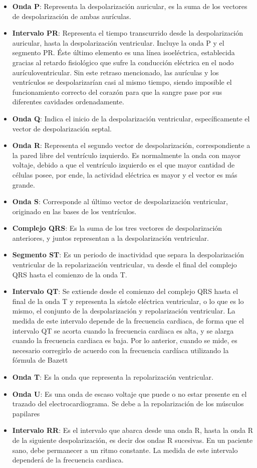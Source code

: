     \begin{itemize}
        \item \textbf{Onda P}: Representa la despolarización auricular, es la suma de los vectores de despolarización de ambas aurículas.
        \item \textbf{Intervalo PR}: Representa el tiempo transcurrido desde la despolarización auricular, hasta la despolarización ventricular. Incluye la onda P y el segmento PR. Éste último elemento es una línea isoeléctrica, establecida gracias al retardo fisiológico que sufre la conducción eléctrica en el nodo aurículoventricular. Sin este retraso mencionado, las aurículas y los ventrículos se despolarizarían casi al mismo tiempo, siendo imposible el funcionamiento correcto del corazón para que la sangre pase por sus diferentes cavidades ordenadamente.
        \item \textbf{Onda Q}: Indica el inicio de la despolarización ventricular, específicamente el vector de despolarización septal.
        \item \textbf{Onda R}: Representa el segundo vector de despolarización, correspondiente a la pared libre del ventrículo izquierdo. Es normalmente la onda con mayor voltaje, debido a que el ventrículo izquierdo es el que mayor cantidad de células posee, por ende, la actividad eléctrica es mayor y el vector es más grande.
        \item \textbf{Onda S}: Corresponde al último vector de despolarización ventricular, originado en las bases de los ventrículos.
        \item \textbf{Complejo QRS}: Es la suma de los tres vectores de despolarización anteriores, y juntos representan a la despolarización ventricular.
        \item \textbf{Segmento ST}: Es un periodo de inactividad que separa la despolarización ventricular de la repolarización ventricular, va desde el final del complejo QRS hasta el comienzo de la onda T. 
        \item \textbf{Intervalo QT}: Se extiende desde el comienzo del complejo QRS hasta el final de la onda T y representa la sístole eléctrica ventricular, o lo que es lo mismo, el conjunto de la despolarización y repolarización ventricular. La medida de este intervalo depende de la frecuencia cardiaca, de forma que el intervalo QT se acorta cuando la frecuencia cardiaca es alta, y se alarga cuando la frecuencia cardiaca es baja. Por lo anterior, cuando se mide, es necesario corregirlo de acuerdo con la frecuencia cardíaca utilizando la fórmula de Bazett
        \item \textbf{Onda T}: Es la onda que representa la repolarización ventricular.
        \item \textbf{Onda U}: Es una onda de escaso voltaje que puede o no estar presente en el trazado del electrocardiograma. Se debe a la repolarización de los músculos papilares
        \item \textbf{Intervalo RR}: Es el intervalo que abarca desde una onda R, hasta la onda R de la siguiente despolarización, es decir dos ondas R sucesivas. En un paciente sano, debe permanecer a un ritmo constante. La medida de este intervalo dependerá de la frecuencia cardiaca.
    \end{itemize}


